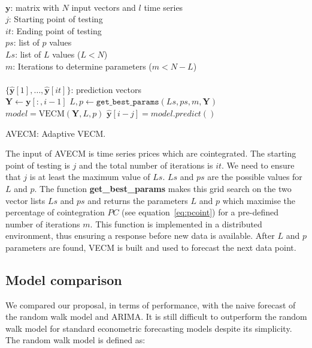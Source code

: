\begin{algorithm}[ht!]
\begin{algorithmic}[1]
\REQUIRE $\,$ \\
$\mathbf{y}$: matrix with $N$ input vectors and $l$ time series\\
$j$: Starting point of testing \\
$it$: Ending point of testing \\
$ps$: list of $p$ values \\
$Ls$: list of $L$ values ($L<N$) \\
$m$: Iterations to determine parameters ($m < N-L$)\\
\ENSURE  $\,$ \\
$\{ \hat{\mathbf{y}}[1],\dots,\hat{\mathbf{y}}[it]\}$: prediction vectors \\
   \STATE $\mathbf{Y} \gets \mathbf{y}[:,i-1]$
    \STATE $L,p \gets
    \texttt{get\_best\_params}(Ls,ps,m,\mathbf{Y})$
        \STATE $model = \text{VECM}(\mathbf{Y},L, p)$
        \STATE $\hat{\mathbf{y}}[i-j] = model.predict()$
\ENDFOR
\end{algorithmic}
\caption{AVECM: Adaptive VECM.}
\label{alg:AVECM}
\end{algorithm}

The input of AVECM is time series prices which are cointegrated. The starting point of testing is $j$ and the total number of iterations is $it$. We need to ensure that $j$ is at least the maximum value of $Ls$. $Ls$ and $ps$ are the possible values for $L$ and $p$.
The function {\bf get\_best\_params} makes this grid search on the two vector
lists $Ls$ and $ps$ and returns the parameters $L$ and $p$ which maximise
the percentage of cointegration $PC$ (see equation~\ref{eq:pcoint}) for a
pre-defined number of iterations $m$. This function is implemented in a distributed 
environment, thus ensuring a response
before new data is available. 
After $L$ and $p$ parameters are found, VECM is built and used
to forecast the next data point.


\subsection{Model comparison} \label{sec:random}
We compared our proposal, in terms of performance, with the naive forecast of the random walk model and ARIMA. It is still difficult to outperform the random walk model for standard econometric forecasting models \cite{lo2011} despite its simplicity. The random walk model is defined as:

